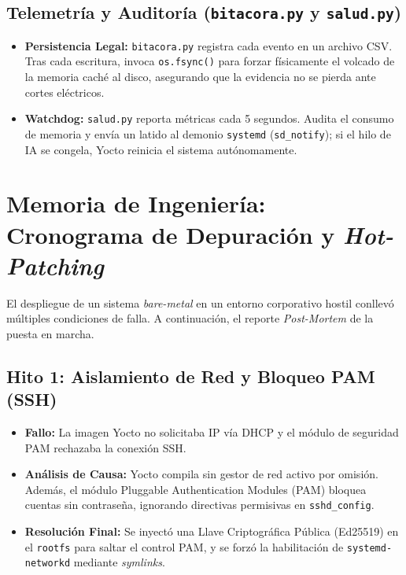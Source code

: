 \documentclass[11pt,a4paper]{article}
\begin{document}
\subsection{Telemetría y Auditoría (\texttt{bitacora.py} y \texttt{salud.py})}
\begin{itemize}
    \item \textbf{Persistencia Legal:} \texttt{bitacora.py} registra cada evento en un archivo CSV. Tras cada escritura, invoca \texttt{os.fsync()} para forzar físicamente el volcado de la memoria caché al disco, asegurando que la evidencia no se pierda ante cortes eléctricos.
    \item \textbf{Watchdog:} \texttt{salud.py} reporta métricas cada 5 segundos. Audita el consumo de memoria y envía un latido al demonio \texttt{systemd} (\texttt{sd\_notify}); si el hilo de IA se congela, Yocto reinicia el sistema autónomamente.
\end{itemize}
\section{Memoria de Ingeniería: Cronograma de Depuración y \textit{Hot-Patching}}
El despliegue de un sistema \textit{bare-metal} en un entorno corporativo hostil conllevó múltiples condiciones de falla. A continuación, el reporte \textit{Post-Mortem} de la puesta en marcha.

\subsection{Hito 1: Aislamiento de Red y Bloqueo PAM (SSH)}
\begin{itemize}
\item \textbf{Fallo:} La imagen Yocto no solicitaba IP vía DHCP y el módulo de seguridad PAM rechazaba la conexión SSH.
\item \textbf{Análisis de Causa:} Yocto compila sin gestor de red activo por omisión. Además, el módulo Pluggable Authentication Modules (PAM) bloquea cuentas sin contraseña, ignorando directivas permisivas en \texttt{sshd\_config}.
\item \textbf{Resolución Final:} Se inyectó una Llave Criptográfica Pública (Ed25519) en el \texttt{rootfs} para saltar el control PAM, y se forzó la habilitación de \texttt{systemd-networkd} mediante \textit{symlinks}.
\end{itemize}
\end{document}
